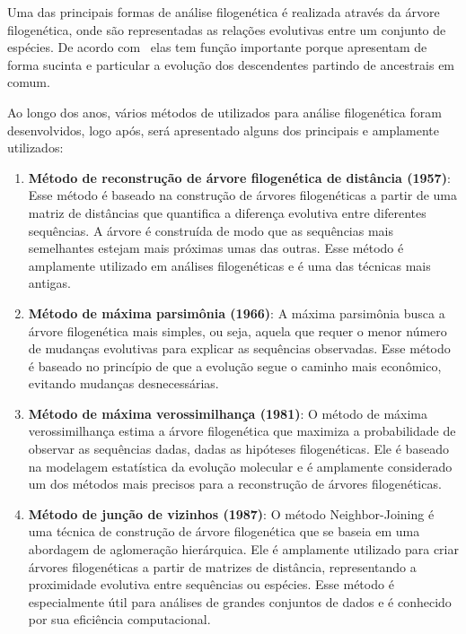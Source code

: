 Uma das principais formas de análise filogenética é realizada através da árvore filogenética, onde são representadas as relações evolutivas entre um conjunto de espécies. De acordo com~\citeauthor{morrison_tree_thinking} elas tem função importante porque apresentam de forma sucinta e particular a evolução dos descendentes partindo de ancestrais em comum.

Ao longo dos anos, vários métodos de utilizados para análise filogenética foram desenvolvidos, logo após, será apresentado alguns dos principais e amplamente utilizados:
\begin{enumerate}
  \item \textbf{Método de reconstrução de árvore filogenética de distância (1957)}: Esse método é baseado na construção de árvores filogenéticas a partir de uma matriz de distâncias que quantifica a diferença evolutiva entre diferentes sequências. A árvore é construída de modo que as sequências mais semelhantes estejam mais próximas umas das outras. Esse método é amplamente utilizado em análises filogenéticas e é uma das técnicas mais antigas.~\cite{sokal_statistical_method_1958}
  \item \textbf{Método de máxima parsimônia (1966)}: A máxima parsimônia busca a árvore filogenética mais simples, ou seja, aquela que requer o menor número de mudanças evolutivas para explicar as sequências observadas. Esse método é baseado no princípio de que a evolução segue o caminho mais econômico, evitando mudanças desnecessárias.~\cite{fitch_toward_definition_1971}
  \item \textbf{Método de máxima verossimilhança (1981)}: O método de máxima verossimilhança estima a árvore filogenética que maximiza a probabilidade de observar as sequências dadas, dadas as hipóteses filogenéticas. Ele é baseado na modelagem estatística da evolução molecular e é amplamente considerado um dos métodos mais precisos para a reconstrução de árvores filogenéticas.~\cite{felsenstein_evolutionary_tree_1981}
  \item \textbf{Método de junção de vizinhos (1987)}: O método Neighbor-Joining é uma técnica de construção de árvore filogenética que se baseia em uma abordagem de aglomeração hierárquica. Ele é amplamente utilizado para criar árvores filogenéticas a partir de matrizes de distância, representando a proximidade evolutiva entre sequências ou espécies. Esse método é especialmente útil para análises de grandes conjuntos de dados e é conhecido por sua eficiência computacional.~\cite{saitou_neighbor_1987} %

\end{enumerate}
